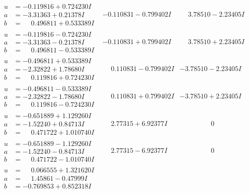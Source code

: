 \documentclass[1p]{elsarticle_modified}
\theoremstyle{definition}
\begin{document}
$$\begin{array}{c|c|c}
\begin{aligned}
u &= -0.119816 + 0.724230 I \\
a &= -3.31363 + 0.21378 I \\
b &= \phantom{-}0.496811 + 0.533389 I\end{aligned}
 & -0.110831 - 0.799402 I & \phantom{-}3.78510 - 2.23405 I \\ \hline\begin{aligned}
u &= -0.119816 - 0.724230 I \\
a &= -3.31363 - 0.21378 I \\
b &= \phantom{-}0.496811 - 0.533389 I\end{aligned}
 & -0.110831 + 0.799402 I & \phantom{-}3.78510 + 2.23405 I \\ \hline\begin{aligned}
u &= -0.496811 + 0.533389 I \\
a &= -2.32822 + 1.78680 I \\
b &= \phantom{-}0.119816 + 0.724230 I\end{aligned}
 & \phantom{-}0.110831 - 0.799402 I & -3.78510 - 2.23405 I \\ \hline\begin{aligned}
u &= -0.496811 - 0.533389 I \\
a &= -2.32822 - 1.78680 I \\
b &= \phantom{-}0.119816 - 0.724230 I\end{aligned}
 & \phantom{-}0.110831 + 0.799402 I & -3.78510 + 2.23405 I \\ \hline\begin{aligned}
u &= -0.651889 + 1.129260 I \\
a &= -1.52240 + 0.84713 I \\
b &= \phantom{-}0.471722 + 1.010740 I\end{aligned}
 & \phantom{-}2.77315 + 6.92377 I & \phantom{-0.000000 } 0 \\ \hline\begin{aligned}
u &= -0.651889 - 1.129260 I \\
a &= -1.52240 - 0.84713 I \\
b &= \phantom{-}0.471722 - 1.010740 I\end{aligned}
 & \phantom{-}2.77315 - 6.92377 I & \phantom{-0.000000 } 0 \\ \hline\begin{aligned}
u &= \phantom{-}0.066555 + 1.321620 I \\
a &= \phantom{-}1.45861 - 0.47999 I \\
b &= -0.769853 + 0.852318 I\end{aligned}

\end{array}$$
\end{document}
